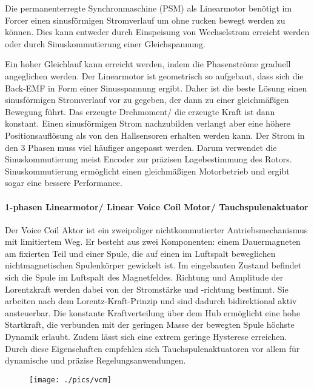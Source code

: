 \begin{description}[leftmargin=2.5cm]
					\item[PSM als Linearmotor] 
					Die permanenterregte Synchronmaschine (PSM) als Linearmotor benötigt im Forcer einen sinusförmigen Stromverlauf um ohne rucken bewegt werden zu können. Dies kann entweder durch Einspeisung von Wechselstrom erreicht werden oder durch Sinuskommutierung einer Gleichspannung. 
					
					\item[Sinuskommutierung]										
					Ein hoher Gleichlauf kann erreicht werden, indem die Phasenströme graduell angeglichen werden. Der Linearmotor ist geometrisch so aufgebaut, dass sich die Back-EMF in Form einer Sinusspannung ergibt. Daher ist die beste Lösung einen sinusförmigen Stromverlauf vor zu gegeben, der dann zu einer gleichmäßigen Bewegung führt. Das erzeugte Drehmoment/ die erzeugte Kraft ist dann konstant. Einen sinusförmigen Strom nachzubilden verlangt aber eine höhere Positionsauflösung als von den Hallsensoren erhalten werden kann. Der Strom in den 3 Phasen muss viel häufiger angepasst werden. Darum verwendet die Sinuskommutierung meist Encoder zur präzisen Lagebestimmung des Rotors. Sinuskommutierung ermöglicht einen gleichmäßigen Motorbetrieb und ergibt sogar eine bessere Performance.						
				\end{description}
				
				\paragraph{1-phasen Linearmotor/ Linear Voice Coil Motor/ Tauchspulenaktuator}
					Der Voice Coil Aktor ist ein zweipoliger nichtkommutierter Antriebsmechanismus mit limitiertem Weg. Er besteht aus zwei Komponenten: einem Dauermagneten am fixierten Teil und einer Spule, die auf einen im Luftspalt beweglichen nichtmagnetischen Spulenkörper gewickelt ist. Im eingebauten Zustand befindet sich die Spule im Luftspalt des Magnetfeldes. Richtung und Amplitude der Lorentzkraft werden dabei von der Stromstärke und -richtung bestimmt. Sie arbeiten nach dem Lorentz-Kraft-Prinzip und sind dadurch bidirektional aktiv ansteuerbar. Die konstante Kraftverteilung über dem Hub ermöglicht eine hohe Startkraft, die verbunden mit der geringen Masse der bewegten Spule höchste Dynamik erlaubt. Zudem lässt sich eine extrem geringe Hysterese erreichen. Durch diese Eigenschaften empfehlen sich Tauchspulenaktuatoren vor allem für dynamische und präzise Regelungsanwendungen.
					\begin{figure}[h]
						\centering
						\texttt{[image: ./pics/vcm]}
					\end{figure}
					\leavevmode \\
					
